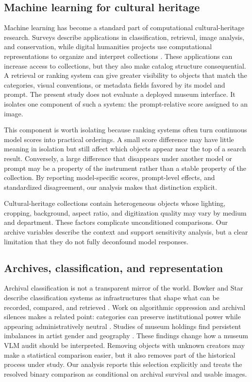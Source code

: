 \documentclass[pdflatex,sn-basic,Numbered]{sn-jnl}
\begin{document}
\subsection{Machine learning for cultural heritage}

Machine learning has become a standard part of computational cultural-heritage research. Surveys describe applications in classification, retrieval, image analysis, and conservation, while digital humanities projects use computational representations to organize and interpret collections \cite{fiorucci2020machine, srinivasan2021arts}. These applications can increase access to collections, but they also make catalog structure consequential. A retrieval or ranking system can give greater visibility to objects that match the categories, visual conventions, or metadata fields favored by its model and prompt. The present study does not evaluate a deployed museum interface. It isolates one component of such a system: the prompt-relative score assigned to an image.

This component is worth isolating because ranking systems often turn continuous model scores into practical orderings. A small score difference may have little meaning in isolation but still affect which objects appear near the top of a search result. Conversely, a large difference that disappears under another model or prompt may be a property of the instrument rather than a stable property of the collection. By reporting model-specific scores, prompt-level effects, and standardized disagreement, our analysis makes that distinction explicit.

Cultural-heritage collections contain heterogeneous objects whose lighting, cropping, background, aspect ratio, and digitization quality may vary by medium and department. 
These factors complicate unconditioned comparisons. Our archive variables describe the context and support sensitivity analysis, but a clear limitation that they do not fully deconfound model responses.

\subsection{Archives, classification, and representation}

Archival classification is not a transparent mirror of the world. Bowker and Star describe classification systems as infrastructures that shape what can be recorded, compared, and retrieved \cite{bowker2000sorting}. Work on algorithmic oppression and archival silences makes a related point: categories can preserve institutional power while appearing administratively neutral \cite{noble2018algorithms, caswell2016archival}. Studies of museum holdings find persistent imbalances in artist gender and geography \cite{topaz2019diversity, meier2021gender}. These findings change how a museum VLM audit should be interpreted. Removing objects with unknown creators may make a statistical comparison easier, but it also removes part of the historical process under study. Our analysis reports this selection explicitly and treats the resolved binary comparison as conditional on archival survival and usable images.
\end{document}
